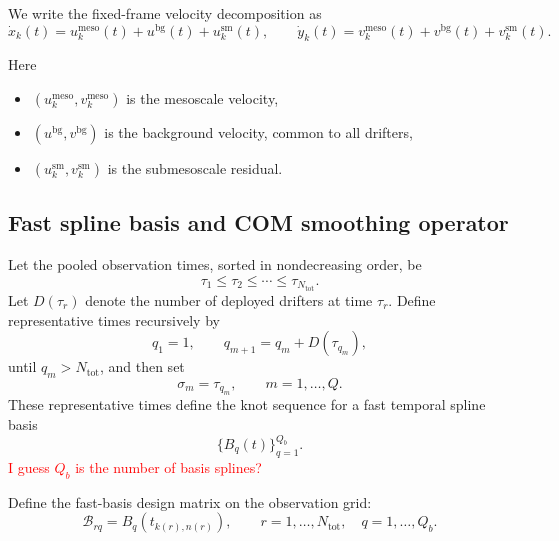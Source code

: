 \documentclass{article}
\begin{document}
We write the fixed-frame velocity decomposition as
\begin{equation}
\dot{x}_k(t)=u_k^{\mathrm{meso}}(t)+u^{\mathrm{bg}}(t)+u_k^{\mathrm{sm}}(t),
\qquad
\dot{y}_k(t)=v_k^{\mathrm{meso}}(t)+v^{\mathrm{bg}}(t)+v_k^{\mathrm{sm}}(t).
\label{eq:full_fixed_model}
\end{equation}

Here
\begin{itemize}
    \item $(u_k^{\mathrm{meso}},v_k^{\mathrm{meso}})$ is the mesoscale velocity,
    \item $(u^{\mathrm{bg}},v^{\mathrm{bg}})$ is the background velocity, common to all drifters,
    \item $(u_k^{\mathrm{sm}},v_k^{\mathrm{sm}})$ is the submesoscale residual.
\end{itemize}

\subsection{Fast spline basis and COM smoothing operator}

Let the pooled observation times, sorted in nondecreasing order, be
\begin{equation}
\tau_1 \le \tau_2 \le \cdots \le \tau_{N_{\mathrm{tot}}}.
\end{equation}
Let $D(\tau_r)$ denote the number of deployed drifters at time $\tau_r$.
Define representative times recursively by
\begin{equation}
q_1=1,
\qquad
q_{m+1}=q_m+D(\tau_{q_m}),
\end{equation}
until $q_m>N_{\mathrm{tot}}$, and then set
\begin{equation}
\sigma_m=\tau_{q_m}, \qquad m=1,\dots,Q.
\end{equation}
These representative times define the knot sequence for a fast temporal spline basis
\begin{equation}
\{B_q(t)\}_{q=1}^{Q_b}.
\end{equation}
\textcolor{red}{I guess $Q_b$ is the number of basis splines?}


Define the fast-basis design matrix on the observation grid:
\begin{equation}
\mathcal{B}_{rq}=B_q\!\left(t_{k(r),n(r)}\right),
\qquad
r=1,\dots,N_{\mathrm{tot}}, \quad q=1,\dots,Q_b.
\label{eq:B_matrix}
\end{equation}
\end{document}
